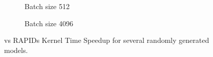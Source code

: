 \begin{figure}[ht]
  \centering
  \begin{subfigure}[b]{.45\textwidth}
    \caption{Batch size 512}

  \end{subfigure}
  \begin{subfigure}[b]{.45\textwidth}
    \caption{Batch size 4096}
  \end{subfigure}
  \hfill
  \caption{\label{fig:randomModels4060}\Treebeard{} vs RAPIDs Kernel Time Speedup for several randomly generated models.}
\end{figure}
